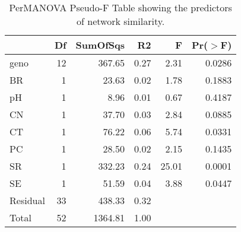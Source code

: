 \begin{table}[ht]
\centering
\begin{tabular}{lrrrrr}
  \hline
 & Df & SumOfSqs & R2 & F & Pr($>$F) \\ 
  \hline
geno & 12 & 367.65 & 0.27 & 2.31 & 0.0286 \\ 
  BR & 1 & 23.63 & 0.02 & 1.78 & 0.1883 \\ 
  pH & 1 & 8.96 & 0.01 & 0.67 & 0.4187 \\ 
  CN & 1 & 37.70 & 0.03 & 2.84 & 0.0885 \\ 
  CT & 1 & 76.22 & 0.06 & 5.74 & 0.0331 \\ 
  PC & 1 & 28.50 & 0.02 & 2.15 & 0.1435 \\ 
  SR & 1 & 332.23 & 0.24 & 25.01 & 0.0001 \\ 
  SE & 1 & 51.59 & 0.04 & 3.88 & 0.0447 \\ 
  Residual & 33 & 438.33 & 0.32 &  &  \\ 
  Total & 52 & 1364.81 & 1.00 &  &  \\ 
   \hline
\end{tabular}
\caption{PerMANOVA Pseudo-F Table showing the predictors of network similarity.} 
\label{tab:cn_perm}
\end{table}
